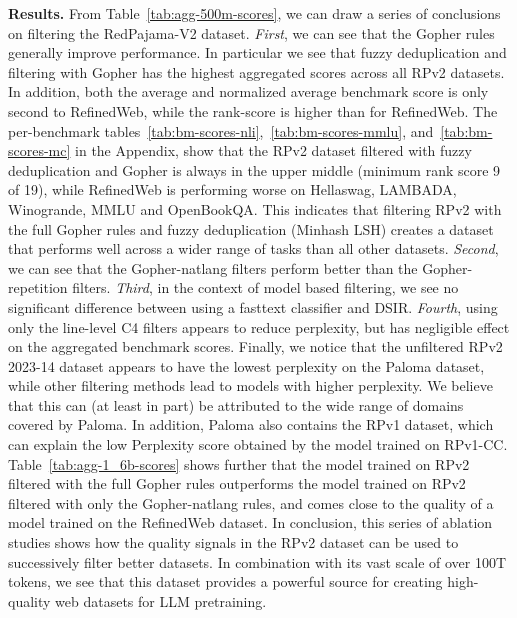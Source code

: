 \documentclass{article}
\begin{document}
{\bf Results.}
From Table~\ref{tab:agg-500m-scores}, we can draw a series of conclusions on filtering the RedPajama-V2 dataset. {\it First}, we can see that the Gopher rules generally improve performance. In particular we see that fuzzy deduplication and filtering with Gopher has the highest aggregated scores across all RPv2 datasets. In addition, both the average and normalized average benchmark score is only second to RefinedWeb, while the rank-score is higher than for RefinedWeb. The per-benchmark tables~\ref{tab:bm-scores-nli},~\ref{tab:bm-scores-mmlu}, and~\ref{tab:bm-scores-mc} in the Appendix, show that the RPv2 dataset filtered with fuzzy deduplication and Gopher is always in the upper middle (minimum rank score 9 of 19), while RefinedWeb is performing worse on Hellaswag, LAMBADA, Winogrande, MMLU and OpenBookQA. This indicates that filtering RPv2 with the full Gopher rules and fuzzy deduplication (Minhash LSH) creates a dataset that performs well across a wider range of tasks than all other datasets. {\it Second}, we can see that the Gopher-natlang filters perform better than the Gopher-repetition filters. {\it Third}, in the context of model based filtering, we see no significant difference between using a fasttext classifier and DSIR. {\it Fourth}, using only the line-level C4 filters appears to reduce perplexity, but has negligible effect on the aggregated benchmark scores. Finally, we notice that the unfiltered RPv2 2023-14 dataset appears to have the lowest perplexity on the Paloma dataset, while other filtering methods lead to models with higher perplexity. We believe that this can (at least in part) be attributed to the wide range of domains covered by Paloma. In addition, Paloma also contains the RPv1 dataset, which can explain the low Perplexity score obtained by the model trained on RPv1-CC. 
Table~\ref{tab:agg-1_6b-scores} shows further that the model trained on RPv2 filtered with the full Gopher rules outperforms the model trained on RPv2 filtered with only the Gopher-natlang rules, and comes close to the quality of a model trained on the RefinedWeb dataset.
In conclusion, this series of ablation studies shows how the quality signals in the RPv2 dataset can be used to successively filter better datasets. In combination with its vast scale of over 100T tokens, we see that this dataset provides a powerful source for creating high-quality web datasets for LLM pretraining.
\end{document}
